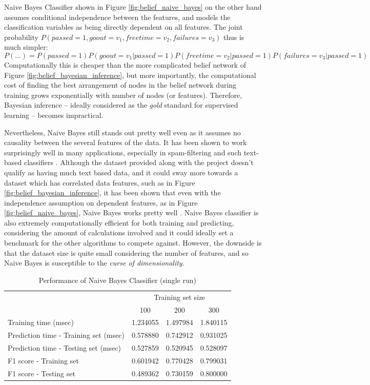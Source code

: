 \documentclass{article}
\begin{document}
	Naive Bayes Classifier shown in Figure \ref{fig:belief_naive_bayes} on the other hand assumes conditional independence between the features, and models the classification variables as being directly dependent on all features. The joint probability $P(passed=1, goout=v_1, freetime=v_2, failures=v_3)$ thus is much simpler: \[P(...) = P(passed=1)P(goout=v_1|passed=1)P(freetime=v_2|passed=1)P(failures=v_3|passed=1)\] 
	Computationally this is cheaper than the more complicated belief network of Figure \ref{fig:belief_bayesian_inference}, but more importantly, the computational cost of finding the best arrangement of nodes in the belief network during training grows exponentially with number of nodes (or features). Therefore, Bayesian inference -- ideally considered as the \emph{gold} standard for supervised learning -- becomes impractical. 
	
	Nevertheless, Naive Bayes still stands out pretty well even as it assumes no causality between the several features of the data. It has been shown to work surprisingly well in many applications, especially in spam-filtering and such text-based classifiers \cite{Metsis06}. Although the dataset provided along with the project doesn't qualify as having much text based data, and it could sway more towards a dataset which has correlated data features, such as in Figure \ref{fig:belief_bayesian_inference}, it has been shown that even with the independence assumption on dependent features, as in Figure \ref{fig:belief_naive_bayes}, Naive Bayes works pretty well \cite{Rish01}. Naive Bayes classifier is also extremely computationally efficient for both training and predicting, considering the amount of calculations involved and it could ideally set a benchmark for the other algorithms to compete against. However, the downside is that the dataset size is quite small considering the number of features, and so Naive Bayes is susceptible to the \emph{curse of dimensionality}.
	
	\begin{table}[h]
		\centering
		\begin{tabular}{l|ccc}
			\toprule
			{} & \multicolumn{3}{c}{Training set size} \\
			{} &       100 &       200 &       300 \\
			\midrule
			Training time (msec)                  &  1.234055 &  1.497984 &  1.840115 \\
			Prediction time - Training set (msec) &  0.578880 &  0.742912 &  0.931025 \\
			Prediction time - Testing set (msec)  &  0.527859 &  0.520945 &  0.528097 \\
			F1 score - Training set               &  0.601942 &  0.770428 &  0.799031 \\
			F1 score - Testing set                &  0.489362 &  0.730159 &  0.800000 \\
			\bottomrule
		\end{tabular}
		\caption{Performance of Naive Bayes Classifier (single run)}
		\label{tab:naive_bayes_1}
	\end{table}
\end{document}
